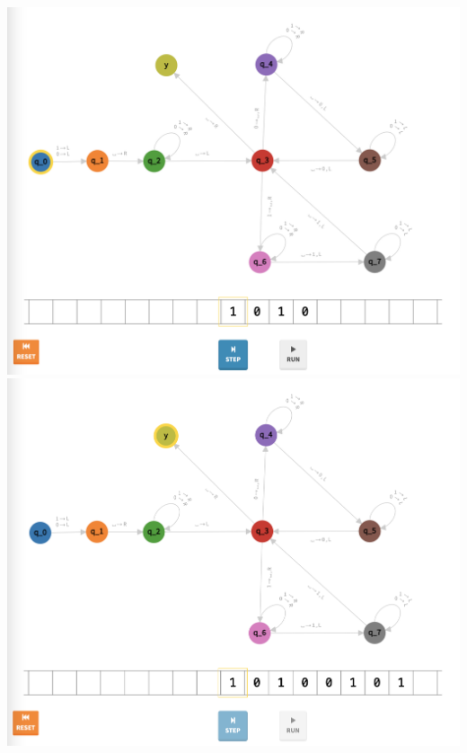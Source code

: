 \documentclass[a4paper]{article}
\begin{document}
\begin{center}
\includegraphics[width=\textwidth]{TM2.9}
\includegraphics[width=\textwidth]{TM2.10}
\end{center}
\newpage
\end{document}
